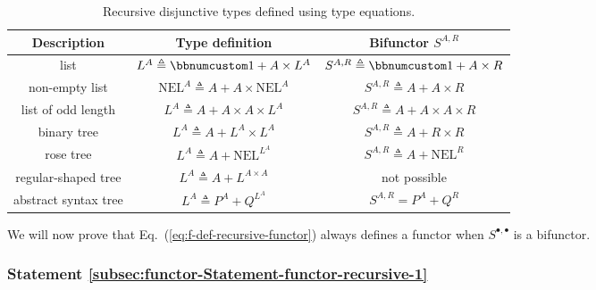 \begin{table}
\begin{centering}
\begin{tabular}{|c|c|c|}
\hline 
\textbf{\small{}Description} & \textbf{\small{}Type definition} & \textbf{\small{}Bifunctor $S^{A,R}$}\tabularnewline
\hline 
\hline 
{\small{}list} & {\small{}$L^{A}\triangleq\bbnum 1+A\times L^{A}$} & {\small{}$S^{A,R}\triangleq\bbnum 1+A\times R$}\tabularnewline
\hline 
{\small{}non-empty list} & {\small{}$\text{NEL}^{A}\triangleq A+A\times\text{NEL}^{A}$} & {\small{}$S^{A,R}\triangleq A+A\times R$}\tabularnewline
\hline 
{\small{}list of odd length} & {\small{}$L^{A}\triangleq A+A\times A\times L^{A}$} & {\small{}$S^{A,R}\triangleq A+A\times A\times R$}\tabularnewline
\hline 
{\small{}binary tree} & {\small{}$L^{A}\triangleq A+L^{A}\times L^{A}$} & {\small{}$S^{A,R}\triangleq A+R\times R$}\tabularnewline
\hline 
{\small{}rose tree} & {\small{}$L^{A}\triangleq A+\text{NEL}^{L^{A}}$} & {\small{}$S^{A,R}\triangleq A+\text{NEL}^{R}$}\tabularnewline
\hline 
{\small{}regular-shaped tree} & {\small{}$L^{A}\triangleq A+L^{A\times A}$} & {\small{}not possible}\tabularnewline
\hline 
{\small{}abstract syntax tree} & {\small{}$L^{A}\triangleq P^{A}+Q^{L^{A}}$} & {\small{}$S^{A,R}=P^{A}+Q^{R}$}\tabularnewline
\hline 
\end{tabular}
\par\end{centering}
\caption{Recursive disjunctive types defined using type equations.\label{tab:Examples-of-recursive-disjunctive-type-equations}}
\end{table}

We will now prove that Eq.~(\ref{eq:f-def-recursive-functor}) always
defines a functor when $S^{\bullet,\bullet}$ is a bifunctor.

\subsubsection{Statement \label{subsec:functor-Statement-functor-recursive-1}\ref{subsec:functor-Statement-functor-recursive-1}}


